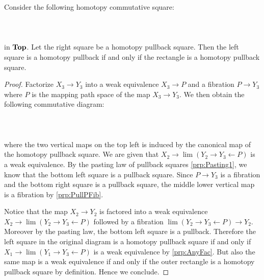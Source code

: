 \begin{prp}\label{prp:Pasting2} Consider the following homotopy commutative square:  
 \\~\\  \\~\\
in $\bold{Top}$. Let the right square be a homotopy pullback square. Then the left square is a homotopy pullback if and only if the rectangle is a homotopy pullback square. 
\begin{proof}
Factorize $X_3\to Y_3$ into a weak equivalence $X_3\to P$ and a fibration $P\to Y_3$ where $P$ is the mapping path space of the map $X_3\to Y_3$. We then obtain the following commutative diagram:  
 \\~\\  \\~\\
where the two vertical maps on the top left is induced by the canonical map of the homotopy pullback square. We are given that $X_2\to\lim(Y_2\rightarrow Y_3\leftarrow P)$ is a weak equivalence. By the pasting law of pullback squares \ref{prp:Pasting1}, we know that the bottom left square is a pullback square. Since $P\to Y_3$ is a fibration and the bottom right square is a pullback square, the middle lower vertical map is a fibration by \ref{prp:PullPFib}. 

Notice that the map $X_2\to Y_2$ is factored into a weak equivalence $X_2\to\lim(Y_2\rightarrow Y_3\leftarrow P)$ followed by a fibration $\lim(Y_2\rightarrow Y_3\leftarrow P)\to Y_2$. Moreover by the pasting law, the bottom left square is a pullback. Therefore the left square in the original diagram is a homotopy pullback square if and only if $X_1\to\lim(Y_1\rightarrow Y_3\leftarrow P)$ is a weak equivalence by \ref{prp:AnyFac}. But also the same map is a weak equivalence if and only if the outer rectangle is a homotopy pullback square by definition. Hence we conclude.
\end{proof}
\end{prp}

